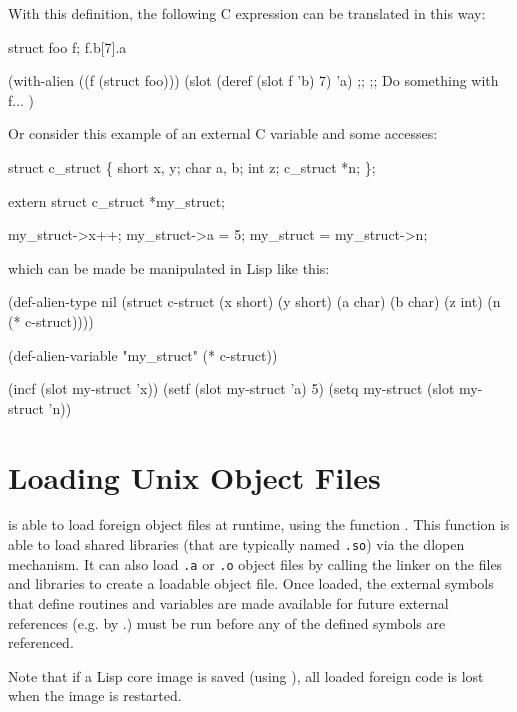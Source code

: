 With this definition, the following C expression can be translated in this way:

\begin{example}
struct foo f;
f.b[7].a

 \myequiv

(with-alien ((f (struct foo)))
  (slot (deref (slot f 'b) 7) 'a)
  ;;
  ;; Do something with f...
  )
\end{example}


Or consider this example of an external C variable and some accesses:

\begin{example}
struct c_struct \{
        short x, y;
        char a, b;
        int z;
        c_struct *n;
\};

extern struct c_struct *my_struct;

my_struct->x++;
my_struct->a = 5;
my_struct = my_struct->n;
\end{example}

which can be made be manipulated in Lisp like this:

\begin{lisp}
(def-alien-type nil
  (struct c-struct
          (x short)
          (y short)
          (a char)
          (b char)
          (z int)
          (n (* c-struct))))

(def-alien-variable "my_struct" (* c-struct))

(incf (slot my-struct 'x))
(setf (slot my-struct 'a) 5)
(setq my-struct (slot my-struct 'n))
\end{lisp}


\section{Loading Unix Object Files}

\cmucl{} is able to load foreign object files at runtime, using the
function . This function is able to load shared
libraries (that are typically named \verb|.so|) via the dlopen
mechanism. It can also load \verb|.a| or \verb|.o| object files by
calling the linker on the files and libraries to create a loadable
object file. Once loaded, the external symbols that define routines
and variables are made available for future external references (e.g.
by .)  must be run before any of
the defined symbols are referenced.

Note that if a Lisp core image is saved (using ), all
loaded foreign code is lost when the image is restarted. 


